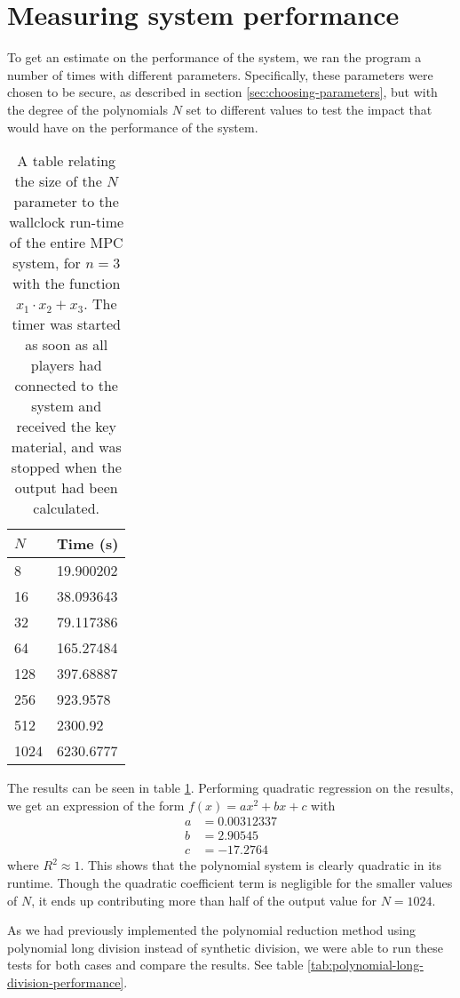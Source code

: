 \documentclass[../main.tex]{subfiles}
\begin{document}
\section{Measuring system performance}
To get an estimate on the performance of the system, we ran the program a number of times with different parameters. Specifically, these parameters were chosen to be secure, as described in section \ref{sec:choosing-parameters}, but with the degree of the polynomials $N$ set to different values to test the impact that would have on the performance of the system.

\begin{table}
    \centering
    \begin{tabular}{l|l}
        $N$  & Time (s)   \\ 
        \hline
        8    & 19.900202  \\
        16   & 38.093643  \\
        32   & 79.117386  \\
        64   & 165.27484  \\
        128  & 397.68887  \\
        256  & 923.9578   \\
        512  & 2300.92    \\
        1024 & 6230.6777 
    \end{tabular}
    \caption{A table relating the size of the $N$ parameter to the wallclock run-time of the entire MPC system, for $n = 3$ with the function $x_1 \cdot x_2 + x_3$. The timer was started as soon as all players had connected to the system and received the key material, and was stopped when the output had been calculated.}
    \label{tab:synthetic-division-performance}
\end{table}

The results can be seen in table \ref{tab:synthetic-division-performance}. Performing quadratic regression on the results, we get an expression of the form $f(x) = a x^2 + b x + c$ with
\begin{align*}
    a &= 0.00312337 \\
    b &= 2.90545 \\
    c &= -17.2764
\end{align*}
where $R^2 \approx 1$. This shows that the polynomial system is clearly quadratic in its runtime. Though the quadratic coefficient term is negligible for the smaller values of $N$, it ends up contributing more than half of the output value for $N = 1024$.

As we had previously implemented the polynomial reduction method using polynomial long division instead of synthetic division, we were able to run these tests for both cases and compare the results. See table \ref{tab:polynomial-long-division-performance}.
\end{document}
